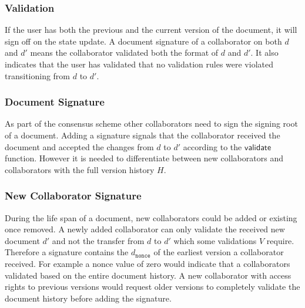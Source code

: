 \subsubsection{Validation}
If the user has both the previous and the current version of the document, it will sign off on the state update. A document signature of a collaborator on both $d$ and $d\prime$ means the collaborator validated both the format of $d$ and $d\prime$. It also indicates that the user has validated that no validation rules were violated transitioning from $d$ to $d\prime$.
\subsubsection{Document Signature}
As part of the consensus scheme other collaborators need to sign the signing root of a document. Adding a signature signals that the collaborator received the document and accepted the changes from $d$ to $d'$ according to the $\mathsf{validate}$ function. However it is needed to differentiate between new collaborators and collaborators with the full version history $H$.
\subsubsection{New Collaborator Signature}
During the life span of a document, new collaborators could be added or existing once removed. A newly added collaborator can only validate the received new document $d'$ and not the transfer from $d$ to $d'$ which some validations $V$ require. Therefore a signature contains the $d_{\mathtt{nonce}}$ of the earliest version a collaborator received. For example a nonce value of zero would indicate that a collaborators validated based on the entire document history.
A new collaborator with access rights to previous versions would request older versions to completely validate the document history before adding the signature.
